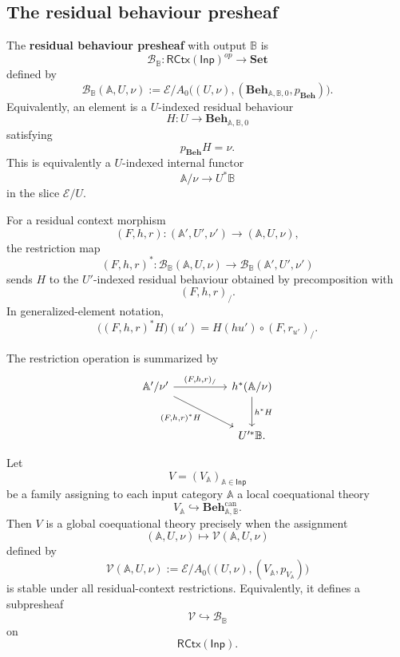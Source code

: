 \subsection{The residual behaviour presheaf}
\label{subsec:residual-behaviour-presheaf}

\begin{definition}
\label{def:residual-behaviour-presheaf}
    The \textbf{residual behaviour presheaf} with output \(\mathbb B\) is
    \[
        \mathcal B_{\mathbb B}:
        \mathsf{RCtx}(\mathsf{Inp})^{op}\to\mathbf{Set}
    \]
    defined by
    \[
        \mathcal B_{\mathbb B}(\mathbb A,U,\nu)
        :=
        \mathcal E/A_0
        \bigl((U,\nu),(\mathbf{Beh}_{\mathbb A,\mathbb B,0},
        p_{\mathbf{Beh}})\bigr).
    \]
    Equivalently, an element is a \(U\)-indexed residual behaviour
    \[
        H:U\to\mathbf{Beh}_{\mathbb A,\mathbb B,0}
    \]
    satisfying
    \[
        p_{\mathbf{Beh}}H=\nu.
    \]
    This is equivalently a \(U\)-indexed internal functor
    \[
        \mathbb A/\nu\to U^*\mathbb B
    \]
    in the slice \(\mathcal E/U\).

    For a residual context morphism
    \[
        (F,h,r):
        (\mathbb A',U',\nu')
        \to
        (\mathbb A,U,\nu),
    \]
    the restriction map
    \[
        (F,h,r)^*:
        \mathcal B_{\mathbb B}(\mathbb A,U,\nu)
        \to
        \mathcal B_{\mathbb B}(\mathbb A',U',\nu')
    \]
    sends \(H\) to the \(U'\)-indexed residual behaviour obtained by
    precomposition with
    \[
        (F,h,r)_{/}.
    \]
    In generalized-element notation,
    \[
        \bigl((F,h,r)^*H\bigr)(u')
        =
        H(h u')\circ(F,r_{u'})_{/}.
    \]
\end{definition}

The restriction operation is summarized by
\[
\begin{tikzcd}[column sep=huge, row sep=large]
    \mathbb A'/\nu'
        \arrow[r, "{(F,h,r)_{/}}"]
        \arrow[dr, "{(F,h,r)^*H}"']
    &
    h^*(\mathbb A/\nu)
        \arrow[d, "h^*H"]
    \\
    &
    U'^*\mathbb B .
\end{tikzcd}
\]

\begin{proposition}
\label{prop:global-theories-as-residual-context-subpresheaves}
    Let
    \[
        V=(V_{\mathbb A})_{\mathbb A\in\mathsf{Inp}}
    \]
    be a family assigning to each input category \(\mathbb A\) a local
    coequational theory
    \[
        V_{\mathbb A}\hookrightarrow
        \mathbf{Beh}^{\mathrm{can}}_{\mathbb A,\mathbb B}.
    \]
    Then \(V\) is a global coequational theory precisely when the assignment
    \[
        (\mathbb A,U,\nu)
        \longmapsto
        \mathcal V(\mathbb A,U,\nu)
    \]
    defined by
    \[
        \mathcal V(\mathbb A,U,\nu)
        :=
        \mathcal E/A_0
        \bigl((U,\nu),(V_{\mathbb A},p_{V_{\mathbb A}})\bigr)
    \]
    is stable under all residual-context restrictions. Equivalently, it defines
    a subpresheaf
    \[
        \mathcal V\hookrightarrow\mathcal B_{\mathbb B}
    \]
    on
    \[
        \mathsf{RCtx}(\mathsf{Inp}).
    \]
\end{proposition}

